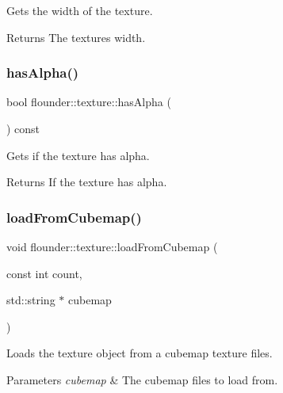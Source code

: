 Gets the width of the texture. 

\begin{DoxyReturn}{Returns}
The textures width. 
\end{DoxyReturn}
\mbox{\label{classflounder_1_1texture_aa74c0c1cb920f5f131832ec6498eba47}} 
\subsubsection{\texorpdfstring{has\+Alpha()}{hasAlpha()}}
{\footnotesize\ttfamily bool flounder\+::texture\+::has\+Alpha (\begin{DoxyParamCaption}{ }\end{DoxyParamCaption}) const\hspace{0.3cm}{\ttfamily [inline]}}



Gets if the texture has alpha. 

\begin{DoxyReturn}{Returns}
If the texture has alpha. 
\end{DoxyReturn}
\mbox{\label{classflounder_1_1texture_aa9703d5d5d76227387a0edfd28503238}} 
\subsubsection{\texorpdfstring{load\+From\+Cubemap()}{loadFromCubemap()}}
{\footnotesize\ttfamily void flounder\+::texture\+::load\+From\+Cubemap (\begin{DoxyParamCaption}\item[{const int}]{count,  }\item[{std\+::string $\ast$}]{cubemap }\end{DoxyParamCaption})\hspace{0.3cm}{\ttfamily [private]}}



Loads the texture object from a cubemap texture files. 


\begin{DoxyParams}{Parameters}
{\em cubemap} & The cubemap files to load from. \\
\hline
\end{DoxyParams}
\mbox{\label{classflounder_1_1texture_a4709b913a032bdcc66e309d39254e923}} 
